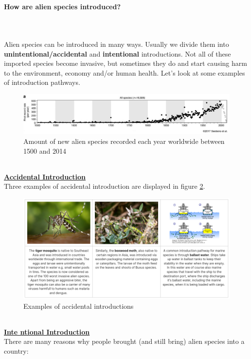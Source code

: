 \documentclass[../summary.tex]{subfiles}
\begin{document}
\paragraph{How are alien species introduced?}
 \ \\\\
 Alien species can be introduced in many ways. Usually we divide them into \textbf{unintentional/accidental} and \textbf{intentional} introductions. Not all of these imported species become invasive, but sometimes they do and start causing harm to the environment, economy and/or human health. Let's look at some examples of introduction pathways.
 
 \begin{figure}[H]
 	\centering
 	\includegraphics[width=0.8\linewidth]{../images/Alien_species_through_time}
 	\caption{Amount of new alien species recorded each year worldwide between 1500 and 2014}
 	\label{fig:alienspeciesthroughtime}
 \end{figure}
 \ \\
\underline{\textbf{ Accidental Introduction}}\\
  Three examples of accidental introduction are displayed in figure \ref{fig:accidentalintroduction}.
 
 \begin{figure}[H]
 	\centering
 	\includegraphics[width=0.9\linewidth]{../images/accidental_introduction}
 	\caption{Examples of accidental introductions}
 	\label{fig:accidentalintroduction}
 \end{figure}
 
 \newpage
 \ \\
 \underline{\textbf{ Inte ntional Introduction}}\\
There are many reasons why people brought (and still bring) alien species into a country:
\end{document}
